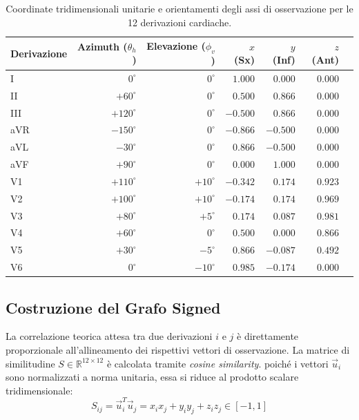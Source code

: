 \begin{table}[htbp]
	\centering
	\caption{Coordinate tridimensionali unitarie e orientamenti degli assi di osservazione per le 12 derivazioni cardiache.}
	\label{tab:lead_vectors_3d}
	\small
	\begin{tabular}{l rr rrr p{4.2cm}}
		\toprule
		\textbf{Derivazione} & \textbf{Azimuth ($\theta_h$)} & \textbf{Elevazione ($\phi_v$)} & \textbf{$x$ (Sx)} & \textbf{$y$ (Inf)} & \textbf{$z$ (Ant)} \\
		\midrule
		I   & $0^\circ$   & $0^\circ$   & $1.000$  & $0.000$  & $0.000$ \\
		II  & $+60^\circ$  & $0^\circ$   & $0.500$  & $0.866$  & $0.000$ \\
		III & $+120^\circ$ & $0^\circ$   & $-0.500$ & $0.866$  & $0.000$ \\
		aVR & $-150^\circ$ & $0^\circ$   & $-0.866$ & $-0.500$ & $0.000$ \\
		aVL & $-30^\circ$  & $0^\circ$   & $0.866$  & $-0.500$ & $0.000$ \\
		aVF & $+90^\circ$  & $0^\circ$   & $0.000$  & $1.000$  & $0.000$ \\
		\midrule
		V1  & $+110^\circ$ & $+10^\circ$ & $-0.342$ & $0.174$  & $0.923$ \\
		V2  & $+100^\circ$ & $+10^\circ$ & $-0.174$ & $0.174$  & $0.969$ \\
		V3  & $+80^\circ$  & $+5^\circ$  & $0.174$  & $0.087$  & $0.981$ \\
		V4  & $+60^\circ$  & $0^\circ$   & $0.500$  & $0.000$  & $0.866$ \\
		V5  & $+30^\circ$  & $-5^\circ$  & $0.866$  & $-0.087$ & $0.492$ \\
		V6  & $0^\circ$    & $-10^\circ$ & $0.985$  & $-0.174$ & $0.000$ \\
		\bottomrule
	\end{tabular}
\end{table}

\subsection{Costruzione del Grafo Signed}
\label{sec:signed_graph}

La correlazione teorica attesa tra due derivazioni $i$ e $j$ è direttamente proporzionale all'allineamento dei rispettivi vettori di osservazione. La matrice di similitudine $S\in\mathbb{R}^{12\times12}$ è calcolata tramite \textit{cosine similarity}. poiché i vettori $\vec{u}_i$ sono normalizzati a norma unitaria, essa si riduce al prodotto scalare tridimensionale:
\begin{equation}
	S_{ij} = \vec{u}_i^T \vec{u}_j = x_i x_j + y_i y_j + z_i z_j \in [-1, 1]
\end{equation}

